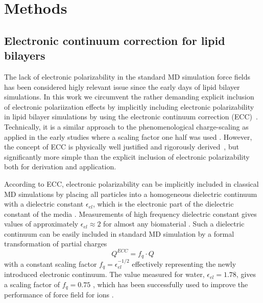 \documentclass[aip,jcp,twocolumn]{revtex4}
\begin{document}
\section{Methods}

\subsection{Electronic continuum correction for lipid bilayers}\label{section:ecc}
The lack of electronic polarizability in the standard MD simulation
force fields has been considered higly relevant issue since the early days of
lipid bilayer simulations.
In this work we circumvent the rather demanding explicit inclusion
of electronic polariization effects \cite{chowdhary13} by implicitly including
electronic polarizability in lipid
bilayer simulations by using the electronic continuum correction
(ECC)~\cite{leontyev11}. 
Technically, it is a similar approach to the phenomenological charge-scaling as applied in 
the early studies where a scaling factor one half was used \cite{jonsson86,egberts94}. 
However, the concept of ECC is 
physically well justified and rigorously derived~\cite{leontyev09, leontyev10, leontyev11},
but significantly more simple than the explicit inclusion of electronic
polarizability \cite{chowdhary13} both for derivation and application.


According to ECC, electronic
polarizability can be implicitly included in classical MD simulations by
placing all particles into a homogeneous dielectric continuum 
with a dielectric constant $\epsilon _{el}$, 
which is the electronic part of the dielectric constant of 
the media \cite{leontyev11}. Measurements of high frequency 
dielectric constant gives values of approximately $\epsilon _{el} \approx 2$ 
for almost any biomaterial \cite{some_original_work, leontyev11}.
Such a dielectric continuum can be easily included in standard MD simulation by
a formal transformation of partial charges 
\begin{equation}
  Q^{ECC} = f_q \cdot Q
\end{equation}
with a constant scaling factor $f_q = \epsilon _{el} ^{-1/2}$ 
effectively representing the newly introduced electronic continuum. 
The value measured for water, $\epsilon _{el} = 1.78$, gives 
a scaling factor of $f_q = 0.75$ \cite{some_orig_source, leontyev11}, which has been
successfully used to improve the performance of force field for ions \cite{kohagen14,kohagen16,??}. 
\end{document}
